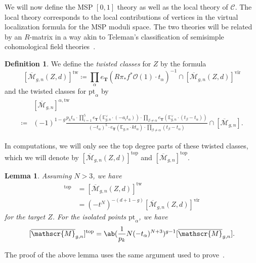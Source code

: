 \documentclass[10pt]{amsart}
\newtheorem{lem}[thm]{Lemma}
\theoremstyle{definition}
\newtheorem{defn}[thm]{Definition}
\theoremstyle{remark}
\theoremstyle{plain}
\theoremstyle{definition}
\theoremstyle{remark}
\newcommand{\E}{\mathbb{E}}
\newcommand{\mc}[1]{\mathcal{#1}}
\newcommand{\msc}[1]{\mathscr{#1}}
\newcommand{\T}{\mathbf{T}}
\newcommand{\mr}[1]{\mathrm{#1}}
\newcommand{\ol}[1]{\overline{#1}}
\newcommand{\1}{\mathbf{1}}
\newcommand{\2}{\mathbf{2}}
\newcommand{\3}{\mathbf{3}}
\newcommand{\vir}{\mr{vir}}
\newcommand{\pt}{\mr{pt}}
\newcommand{\tw}{\mr{tw}}
\renewcommand{\top}{\mr{top}}
\numberwithin{equation}{section}
\begin{document}
We will now define the MSP $[0,1]$ theory as well as the local theory of $\mc{C}$. The local theory corresponds to the local contributions of vertices in the virtual localization formula for the MSP moduli space. The two theories will be related by an $R$-matrix in a way akin to Teleman's classification of semisimple cohomological field theories~\cite{2dsscohft}.
\begin{defn}
    We define the \textit{twisted classes} for $Z$ by the formula 
    \[ [\ol{\msc{M}}_{g,n}(Z, d)]^{\tw} \coloneqq \prod_{\alpha} e_{\T}(R \pi_* f^* \msc{O}(1) \cdot t_{\alpha})^{-1} \cap [\ol{\msc{M}}_{g,n}(Z, d)]^{\vir} \]
    and the twisted classes for $\pt_{\alpha}$ by
    \begin{align*}
        &[\ol{\msc{M}}_{g,n}]^{\alpha, \tw} \\ 
        \coloneqq{} &(-1)^{1-g} \frac{p_k t_{\alpha} \cdot \prod_{i=1}^5 e_{\T}(\E_{g,n}^{\vee}\cdot (-a_i t_{\alpha})) \cdot \prod_{\beta \neq \alpha} e_{\T}(\E_{g,n}^{\vee} \cdot (t_{\beta} - t_{\alpha}))}{(-t_{\alpha})^5 \cdot e_{\T}(\E_{g,n} \cdot kt_{\alpha}) \cdot \prod_{\beta \neq \alpha} (t_{\beta} - t_{\alpha})} \cap [\ol{\msc{M}}_{g,n}].
    \end{align*}
\end{defn}

In computations, we will only see the top degree parts of these twisted classes, which we will denote by $[\ol{\msc{M}}_{g,n}(Z, d)]^{\top}$ and $[\ol{\msc{M}}_{g,n}]^{\top}$.
\begin{lem}\label{lem:topclasses}
    Assuming $N > 3$, we have
    \begin{align*}
        [\ol{\msc{M}}_{g,n}(Z, d)]^{\top} &= [\ol{\msc{M}}_{g,n}(Z, d)]^{\tw} \\
        &= (-t^N)^{-(d+1-g)} [\ol{\msc{M}}_{g,n}(Z, d)]^{\vir}
    \end{align*}
    for the target $Z$. For the isolated points $\pt_{\alpha}$, we have
    \[ [\ol{\msc{M}}_{g,n}]^{\top} = \ab(\frac{1}{p_k} N(-t_{\alpha})^{N+3})^{g-1} [\ol{\msc{M}}_{g,n}]. \]
\end{lem}
The proof of the above lemma uses the same argument used to prove~\cite[Lemma 5.9]{msp2}.
\end{document}
